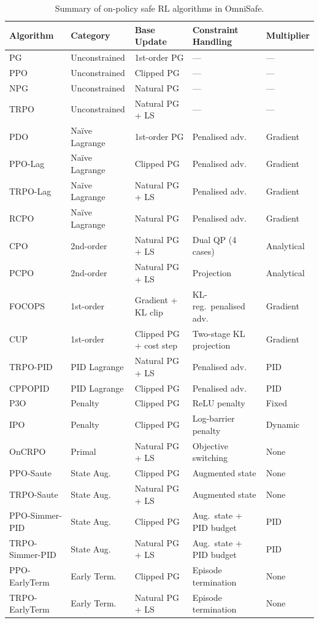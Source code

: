 \documentclass[12pt,a4paper]{article}
\theoremstyle{definition}
\begin{document}
\begin{table}[h]
\centering
\caption{Summary of on-policy safe RL algorithms in OmniSafe.}
\label{tab:summary}
\small
\setlength{\tabcolsep}{4pt}
\begin{tabular}{lllll}
\toprule
\textbf{Algorithm} & \textbf{Category} & \textbf{Base Update} & \textbf{Constraint Handling} & \textbf{Multiplier} \\
\midrule
PG & Unconstrained & 1st-order PG & --- & --- \\
PPO & Unconstrained & Clipped PG & --- & --- \\
NPG & Unconstrained & Natural PG & --- & --- \\
TRPO & Unconstrained & Natural PG + LS & --- & --- \\
\midrule
PDO & Na\"{i}ve Lagrange & 1st-order PG & Penalised adv. & Gradient \\
PPO-Lag & Na\"{i}ve Lagrange & Clipped PG & Penalised adv. & Gradient \\
TRPO-Lag & Na\"{i}ve Lagrange & Natural PG + LS & Penalised adv. & Gradient \\
RCPO & Na\"{i}ve Lagrange & Natural PG & Penalised adv. & Gradient \\
\midrule
CPO & 2nd-order & Natural PG + LS & Dual QP (4 cases) & Analytical \\
PCPO & 2nd-order & Natural PG + LS & Projection & Analytical \\
\midrule
FOCOPS & 1st-order & Gradient + KL clip & KL-reg.\ penalised adv. & Gradient \\
CUP & 1st-order & Clipped PG + cost step & Two-stage KL projection & Gradient \\
\midrule
TRPO-PID & PID Lagrange & Natural PG + LS & Penalised adv. & PID \\
CPPOPID & PID Lagrange & Clipped PG & Penalised adv. & PID \\
\midrule
P3O & Penalty & Clipped PG & ReLU penalty & Fixed \\
IPO & Penalty & Clipped PG & Log-barrier penalty & Dynamic \\
\midrule
OnCRPO & Primal & Natural PG + LS & Objective switching & None \\
\midrule
PPO-Saute & State Aug. & Clipped PG & Augmented state & None \\
TRPO-Saute & State Aug. & Natural PG + LS & Augmented state & None \\
PPO-Simmer-PID & State Aug. & Clipped PG & Aug.\ state + PID budget & PID \\
TRPO-Simmer-PID & State Aug. & Natural PG + LS & Aug.\ state + PID budget & PID \\
\midrule
PPO-EarlyTerm & Early Term. & Clipped PG & Episode termination & None \\
TRPO-EarlyTerm & Early Term. & Natural PG + LS & Episode termination & None \\
\bottomrule
\end{tabular}
\end{table}
\end{document}
